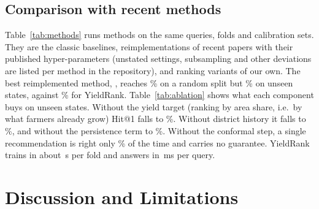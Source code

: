\documentclass[conference]{IEEEtran}
\begin{document}
\subsection{Comparison with recent methods}\label{sec:compare}

Table~\ref{tab:methods} runs \MCNMethods{} methods on the same queries, folds and calibration
sets. They are the classic baselines, \MCNPaperMethods{} reimplementations of \MCNPapers{} recent
papers \cite{dey2024,afzal2025,gunasekaran2025,ahmed2025,mahesh2026,bakr2025} with their published
hyper-parameters (unstated settings, subsampling and other deviations are listed per method in
the repository), and ranking variants of our own. The best reimplemented method,
\MCBestPaperName, reaches \MCBestPaperHitR\% on a random split but \MCBestPaperHit\% on unseen
states, against \OursHitLSO\% for YieldRank. Table~\ref{tab:ablation} shows what each component
buys on unseen states. Without the yield target (ranking by area share, i.e.\ by what farmers
already grow) Hit@1 falls to \MCAblNoYield\%. Without district history it falls to
\MCAblNoHist\%, and without the persistence term to \MCAblNoPers\%. Without the conformal step, a
single recommendation is right only \OursHitLSO\% of the time and carries no guarantee. YieldRank
trains in about \MCOursTrain\,s per fold and answers in \MCOursInfer\,ms per query.

\begin{table}[t]
\caption{All methods on the same queries and folds (mean over 5 folds). Hit@1 for the three
splits; NDCG@3, cold-start Hit@1 and 90\% i.i.d.-LAC set coverage/size on unseen states; training
time per fold. $^{*}$/$^{**}$: differs from YieldRank, Wilcoxon $p<0.05$/$p<0.001$.}
\label{tab:methods}
\centering\scriptsize
\resizebox{\textwidth}{!}{}
\end{table}

\begin{table}[t]
\caption{Ablation of YieldRank on unseen states (Hit@1 \%, NDCG@3, 90\% set coverage and size).}
\label{tab:ablation}
\centering\scriptsize
\resizebox{\columnwidth}{!}{}
\end{table}

\section{Discussion and Limitations}
\end{document}
